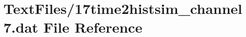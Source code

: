 \hypertarget{17time2histsim__channel7_8dat}{}\section{Text\+Files/17time2histsim\+\_\+channel7.dat File Reference}
\label{17time2histsim__channel7_8dat}
